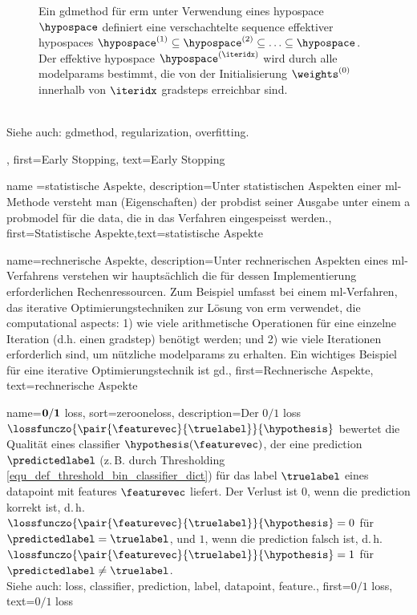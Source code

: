 {{{{{{\begin{figure}[htbp]
\begin{tikzpicture}[>=Stealth, scale=2]
            \end{tikzpicture}
            \caption{Ein \gls{gdmethod} für \gls{erm} unter Verwendung eines \gls{hypospace} $\hypospace$ 
                definiert eine verschachtelte \gls{sequence} effektiver \glspl{hypospace} 
                $\hypospace^{(1)} \subseteq \hypospace^{(2)} \subseteq \ldots \subseteq \hypospace$. 
                Der effektive \gls{hypospace} $\hypospace^{(\iteridx)}$ wird durch alle \glspl{modelparam} 
                bestimmt, die von der Initialisierung $\weights^{(0)}$ innerhalb von $\iteridx$ \glspl{gradstep} 
                erreichbar sind. \label{fig_early_stopping_dict}}
            \end{figure} \\ 
        Siehe auch: \gls{gdmethod}, \gls{regularization}, \gls{overfitting}.},
    first={Early Stopping},
    text={Early Stopping}
}


		 {name ={statistische Aspekte}, 
		 	description={Unter statistischen Aspekten einer  \gls{ml}-Methode versteht man (Eigenschaften) der \gls{probdist}
		 		seiner Ausgabe unter einem a \gls{probmodel} für die  \gls{data}, die in das Verfahren eingespeisst werden.},
		 		first={Statistische Aspekte},text={statistische Aspekte}}

{name={rechnerische Aspekte},
	description={Unter rechnerischen Aspekten  eines \gls{ml}-Verfahrens verstehen wir hauptsächlich die für dessen Implementierung erforderlichen Rechenressourcen. Zum Beispiel umfasst bei einem \gls{ml}-Verfahren, das iterative Optimierungstechniken zur Lösung von \gls{erm} verwendet, die computational aspects: 1) wie viele arithmetische Operationen für eine einzelne Iteration (d.h. einen \gls{gradstep}) benötigt werden; und 2) wie viele Iterationen erforderlich sind, um nützliche \glspl{modelparam} zu erhalten. Ein wichtiges Beispiel für eine iterative Optimierungstechnik ist \gls{gd}.},
	first={Rechnerische Aspekte},
	text={rechnerische Aspekte}
}

{
    name={$\bf 0/1$ loss},
    sort={zerooneloss}, 
    description={Der $0/1$ \gls{loss} 
        $\lossfunczo{\pair{\featurevec}{\truelabel}}{\hypothesis}$ bewertet die Qualität 
        eines \gls{classifier} $\hypothesis(\featurevec)$, der eine \gls{prediction} 
        $\predictedlabel$ (z.\,B. durch Thresholding \eqref{equ_def_threshold_bin_classifier_dict}) 
        für das \gls{label} $\truelabel$ eines \gls{datapoint} mit \glspl{feature} $\featurevec$ liefert. 
        Der Verlust ist $0$, wenn die \gls{prediction} korrekt ist, d.\,h. 
        $\lossfunczo{\pair{\featurevec}{\truelabel}}{\hypothesis}=0$ für 
        $\predictedlabel=\truelabel$, und $1$, wenn die \gls{prediction} falsch ist, d.\,h. 
        $\lossfunczo{\pair{\featurevec}{\truelabel}}{\hypothesis}=1$ für 
        $\predictedlabel\neq\truelabel$.
        \\ 
        Siehe auch: \gls{loss}, \gls{classifier}, \gls{prediction}, \gls{label}, \gls{datapoint}, \gls{feature}.},
    first={$0/1$ loss},
    text={$0/1$ loss}
}

}}}}
